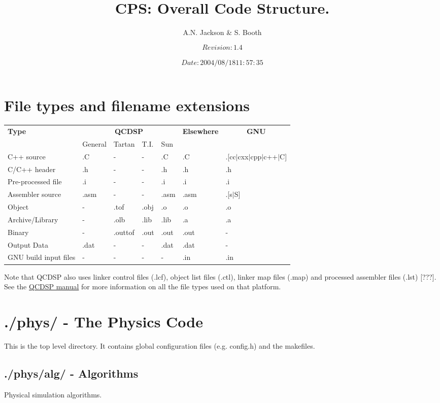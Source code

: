\documentclass[12pt]{article}
\title{CPS: Overall Code Structure.}
\author{A.N. Jackson \& S. Booth}
\date{\mbox{\small $$Revision: 1.4 $$  $$Date: 2004/08/18 11:57:35 $$}}
\begin{document}
\maketitle

\tableofcontents
\newpage

\section{File types and filename extensions}
\begin{tabular}{|l|llll|l|l|}
\hline
{\bf Type} & \multicolumn{4}{c|}{{\bf QCDSP}} & {\bf Elsewhere} & \multicolumn{1}{c|}{\bf GNU}\\
     & General & Tartan & T.I. & Sun &  & \\
\hline
C++ source & .C & - & - & .C & .C & .[cc$|$cxx$|$cpp$|$c++$|$C] \\
C/C++ header & .h & - & - & .h & .h & .h\\ 
Pre-processed file & .i & - & - & .i & .i & .i\\
Assembler source & .asm & - & - & .asm & .asm & .[s$|$S] \\
Object & - & .tof & .obj & .o & .o & .o \\
Archive/Library & - & .olb & .lib & .lib & .a & .a \\
Binary & - & .outtof & .out & .out & .out & - \\
Output Data & .dat & - & - & .dat & .dat & - \\
GNU build input files & - & - & - & - & .in & .in \\
\hline
\end{tabular}

Note that QCDSP also uses linker control files (.lcf), object list files
(.ctl), linker map files (.map) and processed assembler files (.lst) [???].  
See the \href{../qcdsp/toplevel.html#tth_chAp6}{QCDSP manual}
for more information on all the file types used on that platform.


\section{./phys/ - The Physics Code}
This is the top level directory.  It contains global configuration files (e.g.
config.h) and the makefiles.

\subsection{./phys/alg/ - Algorithms}
\label{phys:alg}
Physical simulation algorithms.
\end{document}
